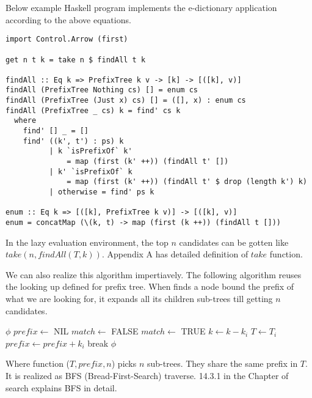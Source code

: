 \documentclass[b5paper]{article}
\begin{document}
Below example Haskell program implements the e-dictionary application
according to the above equations.

\lstset{language=Haskell}
\begin{lstlisting}
import Control.Arrow (first)

get n t k = take n $ findAll t k

findAll :: Eq k => PrefixTree k v -> [k] -> [([k], v)]
findAll (PrefixTree Nothing cs) [] = enum cs
findAll (PrefixTree (Just x) cs) [] = ([], x) : enum cs
findAll (PrefixTree _ cs) k = find' cs k
  where
    find' [] _ = []
    find' ((k', t') : ps) k
          | k `isPrefixOf` k'
              = map (first (k' ++)) (findAll t' [])
          | k' `isPrefixOf` k
              = map (first (k' ++)) (findAll t' $ drop (length k') k)
          | otherwise = find' ps k

enum :: Eq k => [([k], PrefixTree k v)] -> [([k], v)]
enum = concatMap (\(k, t) -> map (first (k ++)) (findAll t []))
\end{lstlisting}

In the lazy evaluation environment, the top $n$ candidates can be
gotten like $take(n, findAll(T, k))$. Appendix A has detailed definition
of $take$ function.

We can also realize this algorithm impertiavely.
The following algorithm reuses the looking up defined for prefix tree. When
finds a node bound the prefix of what we are looking for,
it expands all its children sub-trees till getting $n$ candidates.

\begin{algorithmic}[1]
     \State \Return $\phi$
  \EndIf
  \State $prefix \gets$ NIL
  \Repeat
    \State $match \gets$ FALSE
        \State \Return {}
      \EndIf
        \State $match \gets$ TRUE
        \State $k \gets k - k_i$
        \State $T \gets T_i$
        \State $prefix \gets prefix + k_i$
        \State break
      \EndIf
    \EndFor
  \State \Return $\phi$
\EndFunction
\end{algorithmic}

Where function ($T, prefix, n$) picks $n$ sub-trees. They
share the same prefix in $T$. It is realized as BFS (Bread-First-Search) traverse. 14.3.1 in the Chapter of search explains BFS in detail.
\end{document}
